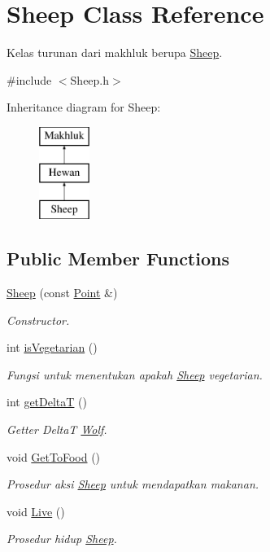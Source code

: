 \hypertarget{class_sheep}{}\section{Sheep Class Reference}
\label{class_sheep}


Kelas turunan dari makhluk berupa \hyperlink{class_sheep}{Sheep}.  




{\ttfamily \#include $<$Sheep.\+h$>$}

Inheritance diagram for Sheep\+:\begin{figure}[H]
\begin{center}
\leavevmode
\includegraphics[height=3.000000cm]{class_sheep}
\end{center}
\end{figure}
\subsection*{Public Member Functions}
\begin{DoxyCompactItemize}
\item 
\hyperlink{class_sheep_a4b3c6eac247be02dfbc9628d594cd04d}{Sheep} (const \hyperlink{class_point}{Point} \&)
\begin{DoxyCompactList}\small\item\em Constructor. \end{DoxyCompactList}\item 
int \hyperlink{class_sheep_a5210b51ab73a9f562111405d6e0ecb46}{is\+Vegetarian} ()
\begin{DoxyCompactList}\small\item\em Fungsi untuk menentukan apakah \hyperlink{class_sheep}{Sheep} vegetarian. \end{DoxyCompactList}\item 
int \hyperlink{class_sheep_ab308d0c603fd3405d5acd5717497a47b}{get\+DeltaT} ()
\begin{DoxyCompactList}\small\item\em Getter DeltaT \hyperlink{class_wolf}{Wolf}. \end{DoxyCompactList}\item 
void \hyperlink{class_sheep_a134766a3fc3060b5a1dd39aa11df262d}{Get\+To\+Food} ()
\begin{DoxyCompactList}\small\item\em Prosedur aksi \hyperlink{class_sheep}{Sheep} untuk mendapatkan makanan. \end{DoxyCompactList}\item 
void \hyperlink{class_sheep_a3a808c6656a9d932f5ec4043c301727b}{Live} ()
\begin{DoxyCompactList}\small\item\em Prosedur hidup \hyperlink{class_sheep}{Sheep}. \end{DoxyCompactList}\end{DoxyCompactItemize}
